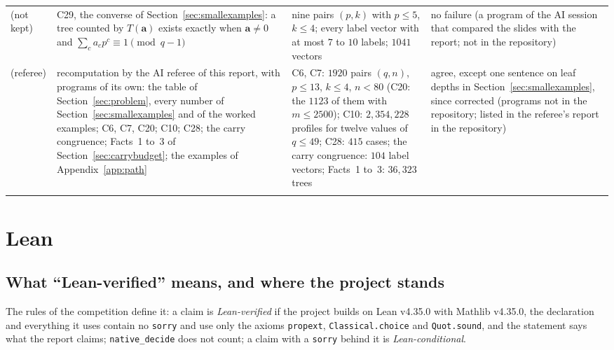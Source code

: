 \documentclass[11pt]{article}
\theoremstyle{definition}
\theoremstyle{remark}
\numberwithin{equation}{section}
\numberwithin{figure}{section}
\begin{document}
{\begin{longtable}{@{}>{\raggedright\arraybackslash}p{}>{\raggedright\arraybackslash}p{}>{\raggedright\arraybackslash}p{}>{\raggedright\arraybackslash}p{}@{}}
(not kept) & C29, the converse of Section~\ref{sec:smallexamples}: a tree counted by $T(\mathbf a)$ exists
 exactly when $\mathbf a\ne0$ and $\sum_ca_cp^c\equiv1\pmod{q-1}$ & nine pairs $(p,k)$ with $p\le5$, $k\le4$;
 every label vector with at most $7$ to $10$ labels; $1041$ vectors & no failure (a program of the AI session
 that compared the slides with the report; not in the repository)\\\addlinespace[3pt]
(referee) & recomputation by the AI referee of this report, with programs of its own: the table of
 Section~\ref{sec:problem}, every number of Section~\ref{sec:smallexamples} and of the worked examples; C6,
 C7, C20; C10; C28; the carry congruence; Facts~1 to~3 of Section~\ref{sec:carrybudget}; the examples of
 Appendix~\ref{app:path}
 & C6, C7: $1920$ pairs $(q,n)$, $p\le13$, $k\le4$, $n<80$ (C20: the $1123$ of them with $m\le2500$); C10:
 $2{,}354{,}228$ profiles for twelve values of $q\le49$; C28: $415$ cases; the carry congruence: $104$ label
 vectors; Facts~1 to~3: $36{,}323$ trees
 & agree, except one sentence on leaf depths in Section~\ref{sec:smallexamples}, since corrected (programs not
 in the repository; listed in the referee's report in the repository)\\\addlinespace[3pt]
\end{longtable}}


\section{Lean}\label{sec:lean}
\subsection{What ``Lean-verified'' means, and where the project stands}
The rules of the competition define it: a claim is \emph{Lean-verified} if the project builds on Lean v4.35.0
with Mathlib v4.35.0, the declaration and everything it uses contain no \texttt{sorry} and use only the axioms
\texttt{propext}, \texttt{Classical.choice} and \texttt{Quot.sound}, and the statement says what the report
claims; \texttt{native\_decide} does not count; a claim with a \texttt{sorry} behind it is
\emph{Lean-conditional}.
\end{document}
